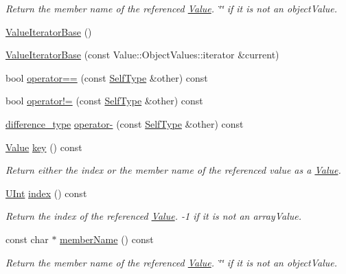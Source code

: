 \begin{DoxyCompactItemize}
\begin{DoxyCompactList}\small\item\em Return the member name of the referenced \hyperlink{classJson_1_1Value}{Value}. \char`\"{}\char`\"{} if it is not an object\-Value. \end{DoxyCompactList}\item 
\hyperlink{classJson_1_1ValueIteratorBase_af45b028d9ff9cbd2554a87878b42dd75}{Value\-Iterator\-Base} ()
\item 
\hyperlink{classJson_1_1ValueIteratorBase_a640e990e5f03a96fd650122a2906f59d}{Value\-Iterator\-Base} (const Value\-::\-Object\-Values\-::iterator \&current)
\item 
bool \hyperlink{classJson_1_1ValueIteratorBase_afc656672ac28502f640ade32c38c1b56}{operator==} (const \hyperlink{classJson_1_1ValueIteratorBase_a9d2a940d03ea06d20d972f41a89149ee}{Self\-Type} \&other) const 
\item 
bool \hyperlink{classJson_1_1ValueIteratorBase_a18c2dd42e0bb989ace141bfe9de52792}{operator!=} (const \hyperlink{classJson_1_1ValueIteratorBase_a9d2a940d03ea06d20d972f41a89149ee}{Self\-Type} \&other) const 
\item 
\hyperlink{classJson_1_1ValueIteratorBase_a4e44bf8cbd17ec8d6e2c185904a15ebd}{difference\-\_\-type} \hyperlink{classJson_1_1ValueIteratorBase_ab786787fcad68ca5e8745aaf520fa17f}{operator-\/} (const \hyperlink{classJson_1_1ValueIteratorBase_a9d2a940d03ea06d20d972f41a89149ee}{Self\-Type} \&other) const 
\item 
\hyperlink{classJson_1_1Value}{Value} \hyperlink{classJson_1_1ValueIteratorBase_aa2ff5e79fc96acd4c3cd288e92614fc7}{key} () const 
\begin{DoxyCompactList}\small\item\em Return either the index or the member name of the referenced value as a \hyperlink{classJson_1_1Value}{Value}. \end{DoxyCompactList}\item 
\hyperlink{namespaceJson_a800fb90eb6ee8d5d62b600c06f87f7d4}{U\-Int} \hyperlink{classJson_1_1ValueIteratorBase_aa90591f5f7f8d2f06cc4605816b53738}{index} () const 
\begin{DoxyCompactList}\small\item\em Return the index of the referenced \hyperlink{classJson_1_1Value}{Value}. -\/1 if it is not an array\-Value. \end{DoxyCompactList}\item 
const char $\ast$ \hyperlink{classJson_1_1ValueIteratorBase_ac05e6bda279201f09803b7f347ddf057}{member\-Name} () const 
\begin{DoxyCompactList}\small\item\em Return the member name of the referenced \hyperlink{classJson_1_1Value}{Value}. \char`\"{}\char`\"{} if it is not an object\-Value. \end{DoxyCompactList}\end{DoxyCompactItemize}
